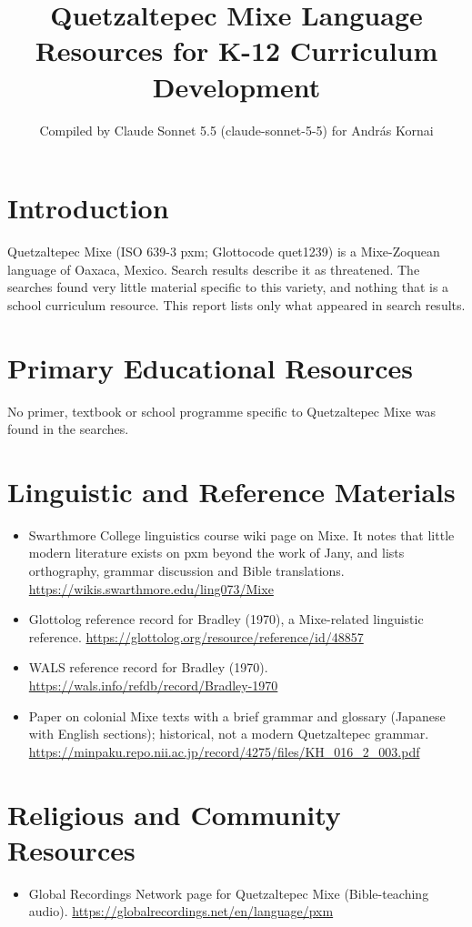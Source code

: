 \documentclass[12pt]{article}
\title{Quetzaltepec Mixe Language Resources for K-12 Curriculum Development}
\author{Compiled by Claude Sonnet 5.5 (claude-sonnet-5-5) for Andr\'as Kornai}
\date{}
\begin{document}
\maketitle

\section{Introduction}
Quetzaltepec Mixe (ISO 639-3 pxm; Glottocode quet1239) is a Mixe-Zoquean language of Oaxaca, Mexico. Search results describe it as threatened. The searches found very little material specific to this variety, and nothing that is a school curriculum resource. This report lists only what appeared in search results.

\section{Primary Educational Resources}
No primer, textbook or school programme specific to Quetzaltepec Mixe was found in the searches.

\section{Linguistic and Reference Materials}
\begin{itemize}
\item Swarthmore College linguistics course wiki page on Mixe. It notes that little modern literature exists on pxm beyond the work of Jany, and lists orthography, grammar discussion and Bible translations. \url{https://wikis.swarthmore.edu/ling073/Mixe}
\item Glottolog reference record for Bradley (1970), a Mixe-related linguistic reference. \url{https://glottolog.org/resource/reference/id/48857}
\item WALS reference record for Bradley (1970). \url{https://wals.info/refdb/record/Bradley-1970}
\item Paper on colonial Mixe texts with a brief grammar and glossary (Japanese with English sections); historical, not a modern Quetzaltepec grammar. \url{https://minpaku.repo.nii.ac.jp/record/4275/files/KH_016_2_003.pdf}
\end{itemize}

\section{Religious and Community Resources}
\begin{itemize}
\item Global Recordings Network page for Quetzaltepec Mixe (Bible-teaching audio). \url{https://globalrecordings.net/en/language/pxm}
\end{itemize}
\end{document}
